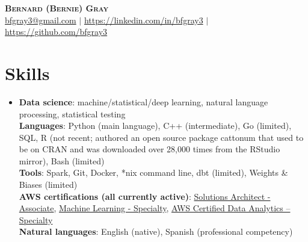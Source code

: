 \documentclass[letterpaper,11pt]{article}
\begin{document}
\begin{center}
    \textbf{\Huge \scshape Bernard (Bernie) Gray} \\ \vspace{1pt}
    \href{mailto:bfgray3@gmail.com}{bfgray3@gmail.com} $|$
    \url{https://linkedin.com/in/bfgray3} $|$
    \url{https://github.com/bfgray3}
\end{center}

\section{Skills}
\begin{itemize}[leftmargin=0.15in, label={}]
    \item{
     \textbf{Data science}{: machine/statistical/deep learning, natural language processing, statistical testing} \\
     \textbf{Languages}{: Python (main language), C++ (intermediate), Go (limited), SQL, R (not recent; authored an open source package cattonum that used to be on CRAN and was downloaded over 28,000 times from the RStudio mirror), Bash (limited)} \\
     \textbf{Tools}{: Spark, Git, Docker, *nix command line, dbt (limited), Weights \& Biases (limited)} \\
     \textbf{AWS certifications (all currently active)}{: \href{https://www.credly.com/badges/d15d58be-270e-4b5e-b9cf-301d16c45d74}{Solutions Architect - Associate}, \href{https://www.credly.com/badges/4adc2428-4a38-4f95-a473-7a1571da7b28}{Machine Learning - Specialty}, \href{https://www.credly.com/badges/23d07045-d56a-4626-99f8-f0815c7d0e6b}{AWS Certified Data Analytics – Specialty}} \\
     \textbf{Natural languages}{: English (native), Spanish (professional competency)}
}
 \end{itemize}
\end{document}
